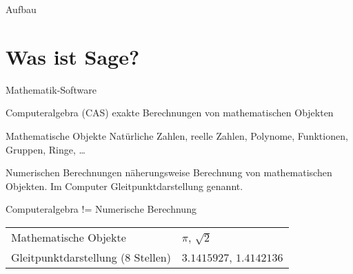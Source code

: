 \documentclass[notes=hide,hyperref={dvipdfmx,pdfpagelabels=false}]{beamer}
\begin{document}
\begin{frame}{Aufbau}
\tableofcontents
\end{frame}



\section{Was ist Sage?}

\begin{frame}{Mathematik-Software}

\begin{block}{Computeralgebra (CAS)}
\alert{exakte} Berechnungen von mathematischen Objekten
\end{block}
\bigskip

\begin{block}{Mathematische Objekte} 
Natürliche Zahlen, reelle Zahlen, Polynome, Funktionen,
Gruppen, Ringe, \ldots
\end{block}

\begin{block}{Numerischen Berechnungen}
\alert{näherungsweise} Berechnung von mathematischen Objekten. Im Computer 
{\color{blue}Gleitpunktdarstellung} genannt.
\end{block}


\begin{block}{Computeralgebra != Numerische Berechnung}
\begin{tabular}{ll}
 Mathematische Objekte & $\pi$, $\sqrt{2}$\\
 Gleitpunktdarstellung (8 Stellen)& $3.1415927$, $1.4142136$
\end{tabular}
\end{block}
\end{frame}
\end{document}
